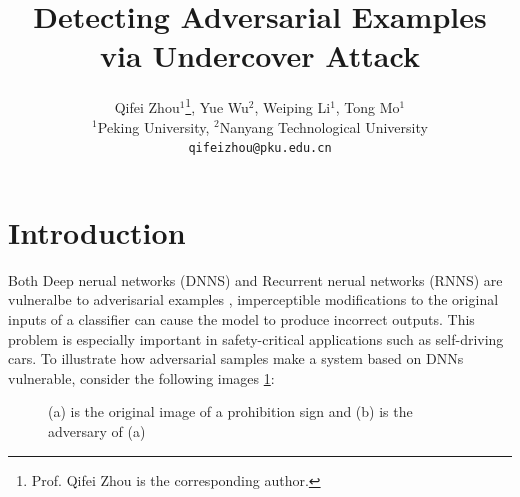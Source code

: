 \documentclass{article}
\title{Detecting Adversarial Examples via Undercover Attack}
\author{%
  Qifei Zhou$^1$\thanks{Prof. Qifei Zhou is the corresponding author.}, Yue Wu$^2$, Weiping Li$^1$, Tong Mo$^1$ \\ 
  $^1$Peking University, $^2$Nanyang Technological University\\
  \texttt{qifeizhou@pku.edu.cn} \\
}
\begin{document}

\maketitle

\begin{abstract}

\end{abstract}

\section{Introduction}
 
Both Deep nerual networks (DNNS) and Recurrent nerual networks (RNNS) are vulneralbe to adverisarial examples \cite{Szegedy2013Intriguing,Goodfellow2014Explaining,Papernot2016Transferability,papernot2016crafting}, imperceptible modifications to the original inputs of a classifier can cause the model to produce incorrect outputs. This problem is especially important in safety-critical applications such as self-driving cars. To illustrate how adversarial samples make a system based on DNNs vulnerable, consider the following 
images \ref{car}:

\begin{figure}[ht]
  \centerline{
  }
  \caption{(a) is the original image of a prohibition sign and (b) is the adversary of (a)}
  \label{car}
\end{figure}
\end{document}
